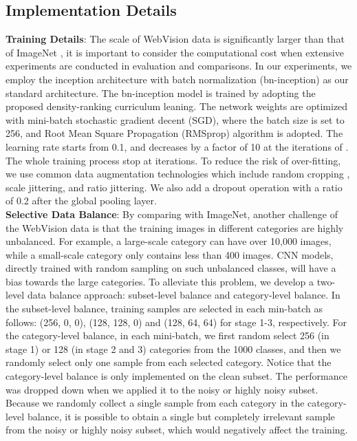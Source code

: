 \documentclass[runningheads]{llncs}
\begin{document}
\subsection{Implementation Details}

\noindent\textbf{Training Details}: The scale of WebVision data \cite{li2017webvisiondata} is significantly larger than  that of ImageNet \cite{DengDSLL009}, it is important to consider the computational cost when extensive experiments are conducted in evaluation and comparisons. In our experiments, we employ the inception architecture with batch normalization (bn-inception) \cite{ioffe2015batch} as our standard architecture.  The bn-inception model is trained by adopting the proposed density-ranking curriculum leaning. The network weights are optimized with mini-batch stochastic gradient decent (SGD), where the batch size is set to 256, and Root Mean Square Propagation (RMSprop) algorithm \cite{ioffe2015batch} is adopted. The learning rate starts from 0.1, and decreases by a factor of 10 at the iterations of .
The whole training process stop at  iterations. To reduce the risk of over-fitting, we use common data augmentation technologies which include random cropping , scale jittering, and ratio jittering. We also add a dropout operation with a ratio of 0.2 after the global pooling layer. \\

\noindent \textbf{Selective Data Balance}: By comparing with ImageNet, another challenge of the WebVision data \cite{li2017webvision} is that the training images in different categories are highly unbalanced. For example, a large-scale category can have over 10,000 images, while a small-scale category only contains  less than 400 images. CNN models, directly trained with random sampling on such unbalanced classes, will have a bias towards the large categories. To alleviate this problem, we develop a two-level data balance approach: subset-level balance and category-level balance. In the subset-level balance, training samples are selected in each min-batch as follows: (256, 0, 0), (128, 128, 0) and (128, 64, 64) for stage 1-3, respectively. For the category-level balance, in each mini-batch, we first random select 256 (in stage 1) or 128 (in stage 2 and 3) categories from the 1000 classes, and then we randomly select only one sample from each selected category. Notice that the category-level balance is only implemented on the clean subset. The performance was dropped down when we applied it to the noisy or highly noisy subset. Because we randomly collect a single sample from each category in the category-level balance, it is possible to obtain a single but completely irrelevant sample from the noisy or highly noisy subset, which would negatively affect the training.\\
\end{document}
